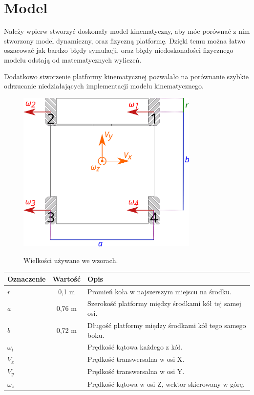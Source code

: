 \chapter{Model}
Należy wpierw stworzyć doskonały model kinematyczny, aby móc porównać z nim stworzony model dynamiczny, oraz fizyczną platformę.
Dzięki temu można łatwo oszacować jak bardzo błędy symulacji, oraz błędy niedoskonałości fizycznego modelu odstają od matematycznych wyliczeń.

Dodatkowo stworzenie platformy kinematycznej pozwalało na porównanie szybkie odrzucanie niedziałających implementacji modelu kinematycznego.
\begin{figure}[H]
\centering
 \includegraphics[width=0.8\textwidth]{graphics/base_dims.pdf}
 \label{graphics:base_dims}
\caption{Wielkości używane we wzorach.}
\end{figure} 
\begin{tabular}{l c l}
Oznaczenie & Wartość & Opis \\
\hline
$r$ & 0,1 m & Promień koła w najszerszym miejscu na środku. \\
$a$ & 0,76 m & Szerokość platformy między środkami kół tej samej osi. \\
$b$ & 0,72 m & Długość platformy między środkami kół tego samego boku. \\
$\omega_i$ & & Prędkość kątowa każdego z kół. \\
$V_x$ & & Prędkość transwersalna w osi X. \\
$V_y$ & & Prędkość transwersalna w osi Y. \\
$\omega_z$ & & Prędkość kątowa w osi Z, wektor skierowany w górę. \\
\end{tabular}

